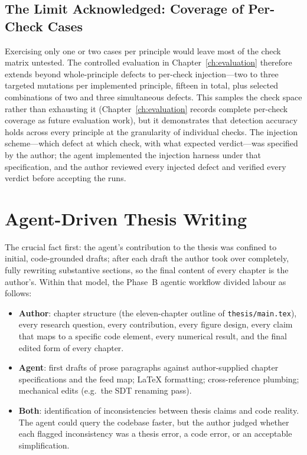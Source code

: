 \subsection{The Limit Acknowledged: Coverage of Per-Check Cases}
\label{subsec:eval-coverage-limit}

Exercising only one or two cases per principle would leave most of the check matrix untested. The controlled evaluation in Chapter~\ref{ch:evaluation} therefore extends beyond whole-principle defects to per-check injection---two to three targeted mutations per implemented principle, fifteen in total, plus selected combinations of two and three simultaneous defects. This samples the check space rather than exhausting it (Chapter~\ref{ch:evaluation} records complete per-check coverage as future evaluation work), but it demonstrates that detection accuracy holds across every principle at the granularity of individual checks. The injection scheme---which defect at which check, with what expected verdict---was specified by the author; the agent implemented the injection harness under that specification, and the author reviewed every injected defect and verified every verdict before accepting the runs.

\section{Agent-Driven Thesis Writing}
\label{sec:agent-thesis}

The crucial fact first: the agent's contribution to the thesis was confined to initial, code-grounded drafts; after each draft the author took over completely, fully rewriting substantive sections, so the final content of every chapter is the author's. Within that model, the Phase~B agentic workflow divided labour as follows:

\begin{itemize}
    \item \textbf{Author}: chapter structure (the eleven-chapter outline of \texttt{thesis/main.tex}), every research question, every contribution, every figure design, every claim that maps to a specific code element, every numerical result, and the final edited form of every chapter.
    \item \textbf{Agent}: first drafts of prose paragraphs against author-supplied chapter specifications and the feed map; LaTeX formatting; cross-reference plumbing; mechanical edits (e.g.\ the SDT renaming pass).
    \item \textbf{Both}: identification of inconsistencies between thesis claims and code reality. The agent could query the codebase faster, but the author judged whether each flagged inconsistency was a thesis error, a code error, or an acceptable simplification.
\end{itemize}

